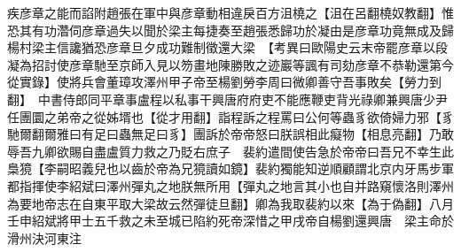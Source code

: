 疾彦章之能而諂附趙張在軍中與彦章動相違戾百方沮橈之【沮在呂翻橈奴教翻】惟恐其有功濳伺彦章過失以聞於梁主每捷奏至趙張悉歸功於凝由是彦章功竟無成及歸楊村梁主信讒猶恐彦章旦夕成功難制徵還大梁　【考異曰歐陽史云末帝罷彦章以段凝為招討使彦章馳至京師入見以笏畫地陳勝敗之迹巖等諷有司劾彦章不恭勒還第今從實錄】使將兵會董璋攻澤州甲子帝至楊劉勞李周曰微卿善守吾事敗矣【勞力到翻】　中書侍郎同平章事盧程以私事干興唐府府吏不能應鞭吏背光祿卿兼興唐少尹任團圜之弟帝之從姊壻也【從才用翻】詣程訴之程罵曰公何等蟲豸欲倚婦力邪【豸馳爾翻爾雅曰有足曰蟲無足曰豸】團訴於帝帝怒曰朕誤相此癡物【相息亮翻】乃敢辱吾九卿欲賜自盡盧質力救之乃貶右庶子　裴約遣間使告急於帝帝曰吾兄不幸生此梟獍【李嗣昭義兒也以齒於帝為兄獍讀如鏡】裴約獨能知逆順顧謂北京内牙馬步軍都指揮使李紹斌曰澤州彈丸之地朕無所用【彈丸之地言其小也自并路窺懷洛則澤州為要地帝志在自東平取大梁故云然彈徒旦翻】卿為我取裴約以來【為于偽翻】八月壬申紹斌將甲士五千救之未至城已陷約死帝深惜之甲戌帝自楊劉還興唐　梁主命於滑州決河東注

